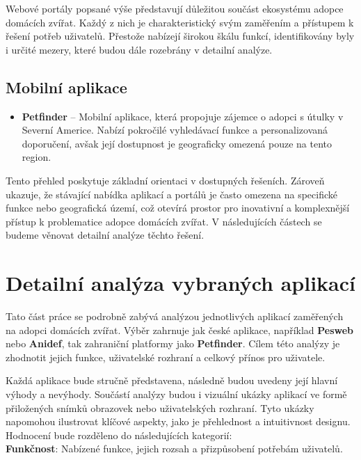 \documentclass[12pt,a4paper]{report}
\begin{document}
Webové portály popsané výše představují důležitou součást ekosystému adopce domácích zvířat. Každý z nich je charakteristický svým zaměřením a přístupem k řešení potřeb uživatelů. Přestože nabízejí širokou škálu funkcí, identifikovány byly i určité mezery, které budou dále rozebrány v detailní analýze.


\subsection{Mobilní aplikace}
\begin{itemize}
    \item \textbf{Petfinder} – Mobilní aplikace, která propojuje zájemce o adopci s útulky v Severní Americe. Nabízí pokročilé vyhledávací funkce a personalizovaná doporučení, avšak její dostupnost je geograficky omezená pouze na tento region.
\end{itemize}

Tento přehled poskytuje základní orientaci v dostupných řešeních. Zároveň ukazuje, že stávající nabídka aplikací a portálů je často omezena na specifické funkce nebo geografická území, což otevírá prostor pro inovativní a komplexnější přístup k problematice adopce domácích zvířat. V následujících částech se budeme věnovat detailní analýze těchto řešení.

\section{Detailní analýza vybraných aplikací}

Tato část práce se podrobně zabývá analýzou jednotlivých aplikací zaměřených na adopci domácích zvířat. Výběr zahrnuje jak české aplikace, například \textbf{Pesweb} nebo \textbf{Anidef}, tak zahraniční platformy jako \textbf{Petfinder}. Cílem této analýzy je zhodnotit jejich funkce, uživatelské rozhraní a celkový přínos pro uživatele.

Každá aplikace bude stručně představena, následně budou uvedeny její hlavní výhody a nevýhody. Součástí analýzy budou i vizuální ukázky aplikací ve formě přiložených snímků obrazovek nebo uživatelských rozhraní. Tyto ukázky napomohou ilustrovat klíčové aspekty, jako je přehlednost a intuitivnost designu. \\

\noindent Hodnocení bude rozděleno do následujících kategorií:\\

\noindent\textbf{Funkčnost}: Nabízené funkce, jejich rozsah a přizpůsobení potřebám uživatelů.\\
\end{document}
